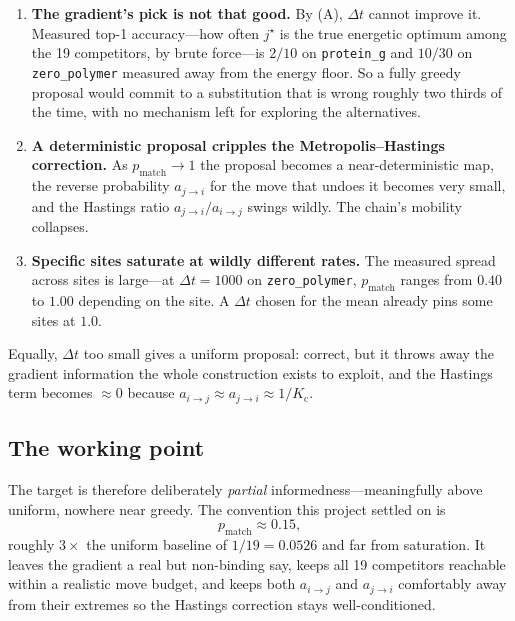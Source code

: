 \documentclass[11pt,a4paper]{article}
\newcommand{\dt}{\Delta t}
\newcommand{\pmatch}{p_{\mathrm{match}}}
\newcommand{\Ncomp}{K_{\mathrm{c}}}
\begin{document}
\begin{enumerate}
  \item \textbf{The gradient's pick is not that good.} By (A), $\dt$ cannot
        improve it. Measured top-1 accuracy---how often $j^{\star}$ is the
        true energetic optimum among the 19 competitors, by brute force---is
        $2/10$ on \texttt{protein\_g} and $10/30$ on \texttt{zero\_polymer}
        measured away from the energy floor. So a fully greedy proposal would
        commit to a substitution that is wrong roughly two thirds of the time,
        with no mechanism left for exploring the alternatives.
  \item \textbf{A deterministic proposal cripples the
        Metropolis--Hastings correction.} As $\pmatch \to 1$ the proposal
        becomes a near-deterministic map, the reverse probability $a_{j\to i}$
        for the move that undoes it becomes very small, and the Hastings ratio
        $a_{j\to i}/a_{i\to j}$ swings wildly. The chain's mobility collapses.
  \item \textbf{Specific sites saturate at wildly different rates.} The
        measured spread across sites is large---at $\dt=1000$ on
        \texttt{zero\_polymer}, $\pmatch$ ranges from $0.40$ to $1.00$
        depending on the site. A $\dt$ chosen for the mean already pins some
        sites at $1.0$.
\end{enumerate}

Equally, $\dt$ too small gives a uniform proposal: correct, but it throws away
the gradient information the whole construction exists to exploit, and the
Hastings term becomes $\approx 0$ because $a_{i\to j} \approx a_{j\to i}
\approx 1/\Ncomp$.

\subsection{The working point}

The target is therefore deliberately \emph{partial} informedness---meaningfully
above uniform, nowhere near greedy. The convention this project settled on is
\begin{equation}
  \pmatch \approx 0.15,
\end{equation}
roughly $3\times$ the uniform baseline of $1/19 = 0.0526$ and far from
saturation. It leaves the gradient a real but non-binding say, keeps all 19
competitors reachable within a realistic move budget, and keeps both
$a_{i\to j}$ and $a_{j\to i}$ comfortably away from their extremes so the
Hastings correction stays well-conditioned.
\end{document}
